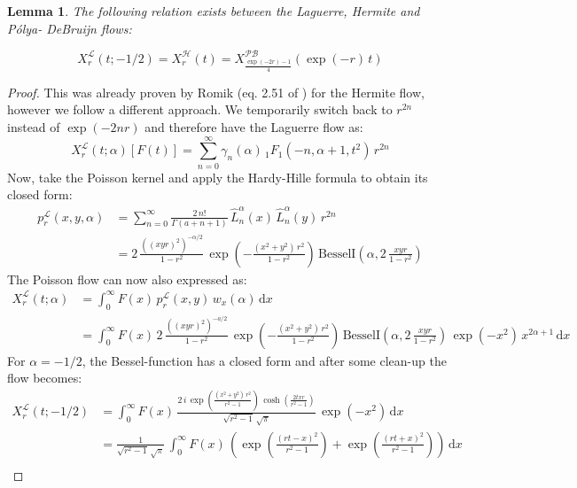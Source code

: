 \documentclass[a4paper,11pt,twoside]{amsart}
\newtheorem{lemma}[theorem]{Lemma}
\newcommand{\verifiedeq}{=}
\newcommand{\verifiedeq}{\stackrel{\checkmark}{=}}
\begin{document}
\begin{lemma} \label{LagisPB} The following relation exists between the Laguerre, Hermite and Pólya- DeBruijn flows:

\begin{equation}
X^{\mathcal{L}}_r\left(t;-1/2\right) = X^{\mathcal{H}}_r\left(t\right) = X^{\mathcal{PB}}_{\tfrac{\exp(-2r)-1}{4}}\left(\exp(-r)\,t\right) 
\end{equation} 
\end{lemma}
\begin{proof}
This was already proven by Romik (eq. 2.51 of \cite{rom}) for the Hermite flow, however we follow a different approach. We temporarily switch back to $r^{2n}$ instead of $\exp(-2nr)$ and therefore have the Laguerre flow as:
\begin{equation}
  X^{\mathcal{L}}_r(t;\alpha)\left[F(t)\right] \verifiedeq \sum_{n=0}^\infty \gamma_n(\alpha)\,{}_1F_1\left(-n, \alpha+1,t^2\right)\,r^{2n}
\end{equation}
Now, take the Poisson kernel and apply the Hardy-Hille formula to obtain its closed form:
\begin{align}
  p^\mathcal{L}_r(x,y, \alpha) &= \sum_{n=0}^\infty \frac{2\,n!}{\Gamma(a+n+1)}\,\hat{L}^{\alpha}_n(x)\,\hat{L}^{\alpha}_n(y)\,r^{2n} \\
  &=2\,\frac{\left((x y r)^2\right)^{-\alpha/2}}{1-r^2}\,\exp\left(-\frac{(x^2+y^2)\,r^2}{1-r^2}\right)\,\text{BesselI}\left(\alpha, 2\,\frac{x y r}{1-r^2}\right) \label{lagpoiclosed}
\end{align}
The Poisson flow can now also expressed as: 
\begin{align}
X^{\mathcal{L}}_r(t;\alpha) &\verifiedeq \int_0^\infty F(x)\,p^\mathcal{L}_r(x,y)\,w_x(\alpha) \,\mathrm{d} x \\
   &\verifiedeq \int_0^\infty F(x)\,2\,\frac{\left((x y r)^2\right)^{-a/2}}{1-r^2}\,\exp\left(-\frac{(x^2+y^2)\,r^2}{1-r^2}\right)\,\text{BesselI}\left(\alpha, 2\,\frac{x y r}{1-r^2}\right)\,\exp(-x^2)\,x^{2\alpha+1} \,\mathrm{d} x
\end{align}
For $\alpha = -1/2$, the Bessel-function has a closed form and after some clean-up the flow becomes:
\begin{align}
X^{\mathcal{L}}_r(t;-1/2) &= \int_0^\infty F(x)\,\frac{2\,i\,\exp\left(\frac{(x^2+y^2)\,r^2}{r^2-1}\right)\,\cosh\left(\frac{2 t x r}{r^2-1}\right)}{\sqrt{r^2-1}\,\sqrt{\pi}}\,\exp(-x^2)\,\mathrm{d} x \\
&= \frac{1}{\sqrt{r^2-1}\,\sqrt{\pi}}\, \int_0^\infty F(x)\,\left(\exp\left(\frac{(r t -x)^2}{r^2-1}\right)+\exp\left(\frac{(r t +x)^2}{r^2-1}\right)\right)\,\mathrm{d} x \\

\end{align}
\end{proof}
\end{document}
